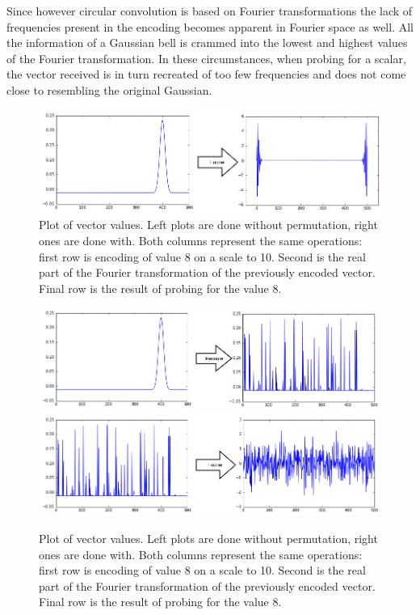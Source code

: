 \documentclass[conference]{IEEEtran}
\begin{document}
Since however circular convolution is based on Fourier transformations the lack of frequencies present in the encoding becomes apparent in Fourier space as well. All the information of a Gaussian bell is crammed into the lowest and highest values of the Fourier transformation. In these circumstances, when probing for a scalar, the vector received is in turn recreated of too few frequencies and does not come close to resembling the original Gaussian. 

\begin{figure}
\includegraphics[width=\columnwidth]{img/scalar-pre-perm-fft.png}
\caption{Plot of vector values. Left plots are done without permutation, right ones are done with. Both columns represent the same operations: first row is encoding of value 8 on a scale to 10. Second is the real part of the Fourier transformation of the previously encoded vector. Final row is the result of probing for the value 8.}
\label{no-perm}
\end{figure}

\begin{figure}
\includegraphics[width=\columnwidth]{img/scalar-perm-step.png}
\includegraphics[width=\columnwidth]{img/scalar-post-perm-fft.png}
\caption{Plot of vector values. Left plots are done without permutation, right ones are done with. Both columns represent the same operations: first row is encoding of value 8 on a scale to 10. Second is the real part of the Fourier transformation of the previously encoded vector. Final row is the result of probing for the value 8.}
\label{no-perm}
\end{figure}
\end{document}

